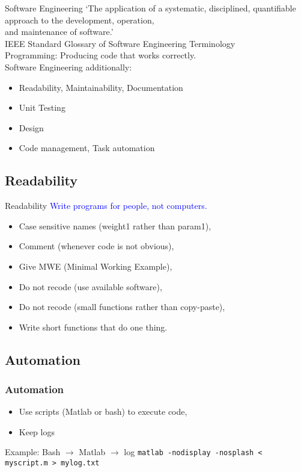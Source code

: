 \documentclass[]{beamer} %
\begin{document}
\begin{frame}{Software Engineering}
\pause
`The application of a systematic, disciplined, quantifiable approach to the development, operation, \\and maintenance of software.'\\
\hfill{\small{IEEE Standard Glossary of Software Engineering Terminology}}\\[6mm]
\pause
Programming: Producing code that works correctly.\\[3mm]
Software Engineering additionally:
\begin{itemize}
\item Readability, Maintainability, Documentation 
\item Unit Testing
\item Design
\item Code management, Task automation
\end{itemize}
\end{frame}


\subsection{Readability}
\begin{frame}{Readability}\centering
\textcolor{blue}{Write programs for people, not computers.}\\[3mm]
\begin{itemize}
\item Case sensitive names (weight1 rather than param1),
\item  Comment (whenever code is not obvious),
\item Give MWE (Minimal Working Example),
\item Do not recode (use available software),
\item Do not recode (small functions rather than copy-paste),
\item Write short functions that do one thing.
\end{itemize}
\end{frame}


\subsection{Automation}
\begin{frame}[fragile]\frametitle{Automation}\centering
\begin{itemize}
\item Use scripts (Matlab or bash) to execute code,
\item Keep logs 
\end{itemize}
\begin{exampleblock}{Example: Bash $\to$ Matlab $\to$ log}
\verb+matlab -nodisplay -nosplash < myscript.m > mylog.txt+
\end{exampleblock}
\end{frame}
\end{document}
